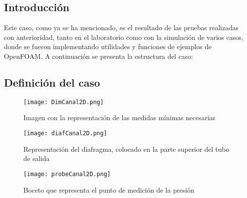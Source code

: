\subsection{Introducción}\label{header-n2}
Este caso, como ya se ha mencionado, es el resultado de las pruebas
realizadas con anterioridad, tanto en el laboratorio como con la
simulación de varios casos, donde se fueron implementando utilidades y
funciones de ejemplos de OpenFOAM. A continuación se presenta la
estructura del caso:


\subsection{Definición del caso}\label{header-n9}

\begin{figure}
\centering
\texttt{[image: DimCanal2D.png]}
\caption{Imagen con la representación de las medidas mínimas necesarias}
\label{fig:DimCanal2D}
\end{figure}

\begin{figure}
\centering
\texttt{[image: diafCanal2D.png]}
\caption[Representación del diafragma]{Representación del diafragma, colocado en la parte superior del tubo de salida}
\label{fig:diafCanal2D}
\end{figure}

\begin{figure}
\centering
\texttt{[image: probeCanal2D.png]}
\caption{Boceto que representa el punto de medición de la presión}
\label{fig:probeCanal2D}
\end{figure}

